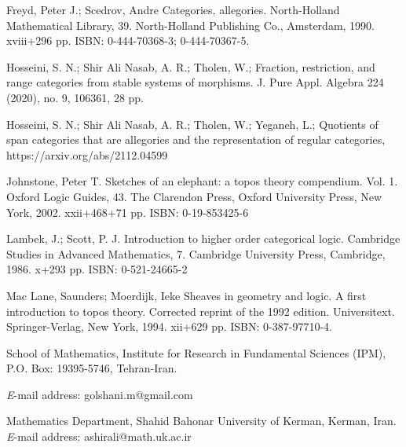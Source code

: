 \documentclass{tac}
\theoremstyle{definition}
\theoremstyle{remark}
\begin{document}
\begin{thebibliography}{10}
 Freyd, Peter J.; Scedrov, Andre Categories, allegories. North-Holland Mathematical Library, 39. North-Holland Publishing Co., Amsterdam, 1990. xviii+296 pp. ISBN: 0-444-70368-3; 0-444-70367-5.

 Hosseini, S. N.; Shir Ali Nasab, A. R.; Tholen, W.; Fraction, restriction, and range categories from stable systems of morphisms. J. Pure Appl. Algebra 224 (2020), no. 9, 106361, 28 pp.

  Hosseini, S. N.; Shir Ali Nasab, A. R.; Tholen, W.;  Yeganeh, L.;  Quotients of span categories that are allegories and the representation of regular categories, https://arxiv.org/abs/2112.04599



     Johnstone, Peter T. Sketches of an elephant: a topos theory compendium. Vol. 1. Oxford Logic Guides, 43. The Clarendon Press, Oxford University Press, New York, 2002. xxii+468+71 pp. ISBN: 0-19-853425-6

 Lambek, J.; Scott, P. J. Introduction to higher order categorical logic. Cambridge Studies in Advanced Mathematics, 7. Cambridge University Press, Cambridge, 1986. x+293 pp. ISBN: 0-521-24665-2

 Mac Lane, Saunders; Moerdijk, Ieke Sheaves in geometry and logic. A first introduction to topos theory. Corrected reprint of the 1992 edition. Universitext. Springer-Verlag, New York, 1994. xii+629 pp. ISBN: 0-387-97710-4.
\end{thebibliography}

\noindent
School of Mathematics,
\noindent
Institute for Research in Fundamental Sciences (IPM),
\noindent
P.O. Box:
19395-5746,
\noindent
Tehran-Iran.

\noindent
{\emph E-mail address:} golshani.m@gmail.com
\begin{center}
\end{center}
\noindent
Mathematics Department,
Shahid Bahonar University of Kerman,
Kerman, Iran.
\\
{\emph E-mail address:} ashirali@math.uk.ac.ir
\end{document}
